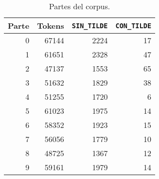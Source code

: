 \documentclass[runningheads,a4paper]{llncs}
\begin{document}
\begin{table}[ht]
 	\renewcommand{\arraystretch}{1.3}
	\renewcommand{\tabcolsep}{3pt}
	\caption{Partes del corpus.}
	\label{table:partes-corpus}
	\centering
	\begin{tabular}{r r r r}
		\hline\hline
		\multicolumn{1}{c}{\textbf{Parte}} 
		& \multicolumn{1}{c}{\textbf{Tokens}} 
		& \multicolumn{1}{c}{\textbf{\texttt{SIN\_TILDE}}} 
		& \multicolumn{1}{c}{\textbf{\texttt{CON\_TILDE}}} \\
		\hline
		0 & 67144 & 2224 & 17 \\
		1 & 61651 & 2328 & 47 \\
		2 & 47137 & 1553 & 65 \\
		3 & 51632 & 1829 & 38 \\
		4 & 51255 & 1720 & 6 \\
		5 & 61023 & 1975 & 14 \\
		6 & 58352 & 1923 & 15 \\
		7 & 56056 & 1779 & 10 \\
		8 & 48725 & 1367 & 12 \\
		9 & 59161 & 1979 & 14 \\
		\hline
	\end{tabular}
\end{table}
\end{document}
